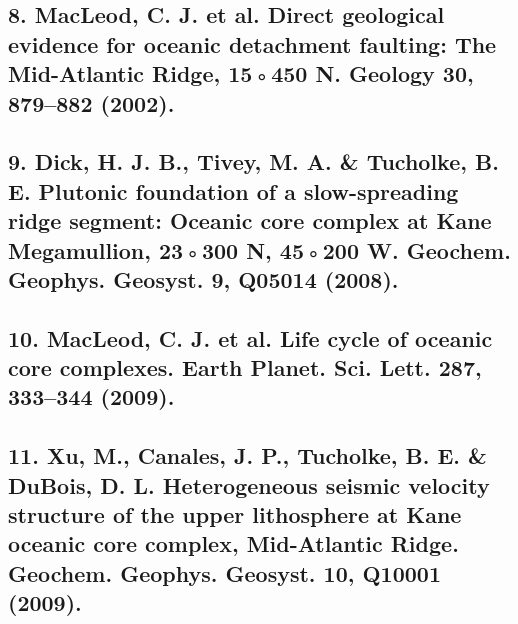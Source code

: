 \documentclass[11pt]{article}
\begin{document}
\subsection{8. MacLeod, C. J. et al. Direct geological evidence for oceanic detachment faulting: The Mid-Atlantic Ridge, 15◦450 N. Geology 30, 879–882 (2002).}
\label{sec-1-5}
\subsection{9. Dick, H. J. B., Tivey, M. A. \& Tucholke, B. E. Plutonic foundation of a slow-spreading ridge segment: Oceanic core complex at Kane Megamullion, 23◦300 N, 45◦200 W. Geochem. Geophys. Geosyst. 9, Q05014 (2008).}
\label{sec-1-6}
\subsection{10. MacLeod, C. J. et al. Life cycle of oceanic core complexes. Earth Planet. Sci. Lett. 287, 333–344 (2009).}
\label{sec-1-7}
\subsection{11. Xu, M., Canales, J. P., Tucholke, B. E. \& DuBois, D. L. Heterogeneous seismic velocity structure of the upper lithosphere at Kane oceanic core complex, Mid-Atlantic Ridge. Geochem. Geophys. Geosyst. 10, Q10001 (2009).}
\label{sec-1-8}
\end{document}
